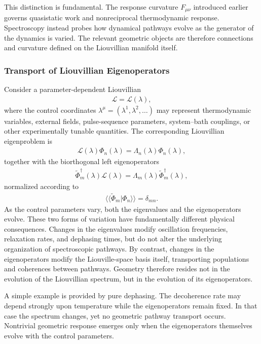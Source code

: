 This distinction is fundamental. The response curvature
$F_{\mu\nu}$ introduced earlier governs quasistatic work and
nonreciprocal thermodynamic response. Spectroscopy instead probes
how dynamical pathways evolve as the generator of the dynamics is
varied. The relevant geometric objects are therefore connections
and curvature defined on the Liouvillian manifold itself.

\subsubsection{Transport of Liouvillian Eigenoperators}
Consider a parameter-dependent Liouvillian
\begin{align}
\mathcal L=\mathcal L(\lambda),
\end{align}
where the control coordinates
$\lambda^\mu=(\lambda^1,\lambda^2,\ldots)$
may represent thermodynamic variables, external fields,
pulse-sequence parameters, system--bath couplings, or other
experimentally tunable quantities. The corresponding
Liouvillian eigenproblem is
\begin{align}
\mathcal L(\lambda)\Phi_n(\lambda)
=
\Lambda_n(\lambda)\Phi_n(\lambda),
\end{align}
together with the biorthogonal left eigenoperators
\begin{align}
\widetilde\Phi_m^\dagger(\lambda)
\mathcal L(\lambda)
=
\Lambda_m(\lambda)
\widetilde\Phi_m^\dagger(\lambda),
\end{align}
normalized according to
\begin{align}
\langle\!\langle
\widetilde\Phi_m
|
\Phi_n
\rangle\!\rangle
=
\delta_{mn}.
\end{align}
As the control parameters vary, both the eigenvalues and the
eigenoperators evolve. These two forms of variation have
fundamentally different physical consequences.
Changes in the eigenvalues modify oscillation frequencies,
relaxation rates, and dephasing times, but do not alter the
underlying organization of spectroscopic pathways. By contrast,
changes in the eigenoperators modify the Liouville-space basis
itself, transporting populations and coherences between
pathways. Geometry therefore resides not in the evolution of the
Liouvillian spectrum, but in the evolution of its eigenoperators.

A simple example is provided by pure dephasing. The decoherence
rate may depend strongly upon temperature while the
eigenoperators remain fixed. In that case the spectrum changes,
yet no geometric pathway transport occurs. Nontrivial geometric
response emerges only when the eigenoperators themselves evolve
with the control parameters.

